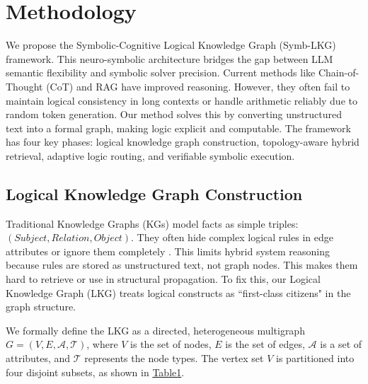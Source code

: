 \documentclass{article}
\theoremstyle{plain}
\theoremstyle{definition}
\theoremstyle{remark}
\begin{document}
\section{Methodology}

We propose the Symbolic-Cognitive Logical Knowledge Graph (Symb-LKG) framework. This neuro-symbolic architecture bridges the gap between LLM semantic flexibility and symbolic solver precision. Current methods like Chain-of-Thought (CoT) \cite{wei2022cot} and RAG \cite{Lewis2020retrieval} have improved reasoning. However, they often fail to maintain logical consistency in long contexts or handle arithmetic reliably due to random token generation. Our method solves this by converting unstructured text into a formal graph, making logic explicit and computable. The framework has four key phases: logical knowledge graph construction, topology-aware hybrid retrieval, adaptive logic routing, and verifiable symbolic execution.

\subsection{Logical Knowledge Graph Construction}

Traditional Knowledge Graphs (KGs) model facts as simple triples: $(Subject, Relation, Object)$. They often hide complex logical rules in edge attributes or ignore them completely \cite{ji2021survey,pan2024unifying}. This limits hybrid system reasoning because rules are stored as unstructured text, not graph nodes. This makes them hard to retrieve or use in structural propagation. To fix this, our Logical Knowledge Graph (LKG) treats logical constructs as ``first-class citizens" in the graph structure.


We formally define the LKG as a directed, heterogeneous multigraph $G = (V, E, \mathcal{A}, \mathcal{T})$, where $V$ is the set of nodes, $E$ is the set of edges, $\mathcal{A}$ is a set of attributes, and $\mathcal{T}$ represents the node types. The vertex set $V$ is partitioned into four disjoint subsets, as shown in \hyperref[tab:lkg_nodes]{Table1}.
\end{document}
